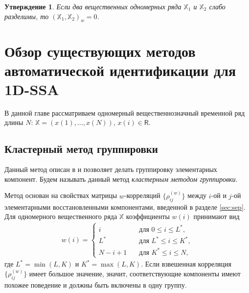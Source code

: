 \documentclass[specialist,
               substylefile = spbu.rtx,
               subf,href,colorlinks=true, 12pt]{disser}
\newtheorem{Th}{Утверждение}
\begin{document}
\begin{Th} \cite[Corollary 6.2]{Golyandina.etal2001} \label{th:sep_wcor}
Если два вещественных одномерных ряда $\mathbb{X}_1$ и $\mathbb{X}_2$ слабо разделимы, то $(\mathbb{X}_1, \mathbb{X}_2)_w = 0$.
\end{Th}

\chapter{Обзор существующих методов автоматической идентификации для 1D-SSA}
\label{sec:1d_methods}
В данной главе рассматриваем одномерный вещественнозначный временной ряд длины $N$: $\mathbb{X}= (x(1),\ldots,x(N))$, $x(i) \in \mathsf{R}$.

\section{Кластерный метод группировки} \label{sec:1D_wcor}
Данный метод описан в \cite{Golyandina.Zhigljavsky2012} и позволяет делать группировку элементарных компонент.
Будем называть данный метод \textit{кластерным методом группировки}.


Метод основан на свойствах матрицы $w$-корреляций $\{\rho^{(w)}_{ij}\}$ между $i$-ой и $j$-ой элементарными восстановленными компонентами, введенной в разделе \ref{sec:sep}.
Для одномерного вещественного ряда $\mathbb{X}$ коэффициенты $w(i)$ принимают вид
\begin{gather} \label{eq:w_i}
 w(i) =
\begin{cases}
i &\quad \text{для } 0 \leqslant i \leqslant L^*, \\
L^* & \quad \text{для } L^* \leqslant i \leqslant K^*, \\
N - i + 1 & \quad \text{для } K^* \leqslant i \leqslant N,
\end{cases}
\end{gather}
где $L^* = \min(L,K)$ и $K^* = \max(L,K)$.
Если взвешенная корреляция $\{\rho^{(w)}_{ij}\}$ имеет большое значение, значит, соответствующие компоненты имеют похожее поведение и должны быть включены в одну группу.
\end{document}
